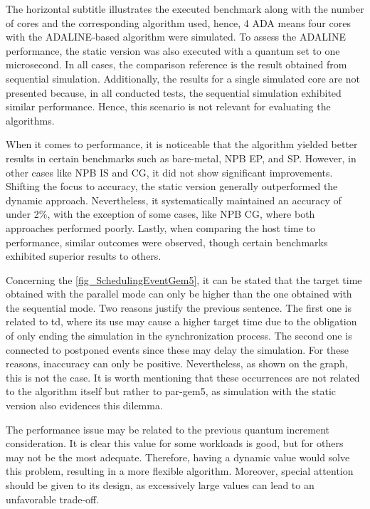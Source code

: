 The horizontal subtitle illustrates the executed benchmark along with the number of cores and the corresponding algorithm used, hence, 4 ADA 
means four cores with the ADALINE-based algorithm were simulated. To assess the ADALINE performance, the static version was also executed with 
a quantum set to one microsecond. In all cases, the comparison reference is the result obtained from sequential simulation. Additionally, the 
results for a single simulated core are not presented because, in all conducted tests, the sequential simulation exhibited similar performance. 
Hence, this scenario is not relevant for evaluating the algorithms.

When it comes to performance, it is noticeable that the algorithm yielded better results in certain benchmarks such as bare-metal, NPB EP, and SP. 
However, in other cases like NPB IS and CG, it did not show significant improvements. Shifting the focus to accuracy, the static version generally 
outperformed the dynamic approach. Nevertheless, it systematically maintained an accuracy of under 2\%, with the exception of some cases, like
NPB CG, where both approaches performed poorly. Lastly, when comparing the host time to performance, similar outcomes were observed, though 
certain benchmarks exhibited superior results to others.

Concerning the \autoref{fig_SchedulingEventGem5}, it can be stated that the target time obtained with the parallel mode can only 
be higher than the one obtained with the sequential mode. Two reasons justify the previous sentence. The first one is related to 
\gls{td}, where its use may cause a higher target time due to the obligation of only ending the simulation in the synchronization process. 
The second one is connected to postponed events since these may delay the simulation. For these reasons, inaccuracy can only be positive.
Nevertheless, as shown on the graph, this is not the case. It is worth mentioning that these occurrences are not related to 
the algorithm itself but rather to par-gem5, as simulation with the static version also evidences this dilemma.

The performance issue may be related to the previous quantum increment consideration. It is clear this value for some workloads is good, but 
for others may not be the most adequate. Therefore, having a dynamic value would solve this problem, resulting in a more flexible algorithm. 
Moreover, special attention should be given to its design, as excessively large values can lead to an unfavorable trade-off.


